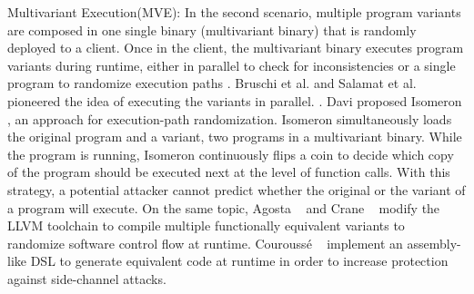 \begin{usage}{Multivariant Execution(MVE):}
    \label{usage:mve}
    \normalfont
    In the second scenario, multiple program variants are composed in one single binary (multivariant binary) that is randomly deployed to a client. Once in the client, the multivariant binary executes program variants during runtime, either in parallel to check for inconsistencies or a single program to randomize execution paths \cite{bhatkar03}. Bruschi et al. \cite{bruschi2007diversified} and Salamat et al. \cite{salamat2007stopping} pioneered the idea of executing the variants in parallel. . Davi \etal proposed Isomeron \cite{davi2015isomeron}, an approach  for execution-path randomization. Isomeron simultaneously loads the original program and a variant, \ie two programs in a multivariant binary. While the program is running, Isomeron continuously flips a coin to decide which copy of the program should be executed next at the level of function calls. With this strategy, a potential attacker cannot predict whether the original or the variant of a program will execute. On the same topic,
    Agosta \etal~\cite{agosta2015meet} and Crane \etal~\cite{crane2015thwarting}
    modify the LLVM toolchain to compile multiple functionally equivalent variants to randomize software control flow at runtime.
    Courouss{\'e} \etal~\cite{courousse2016runtime} implement an assembly-like DSL to generate equivalent code at runtime in order to increase protection against side-channel attacks.  
    

    
\end{usage}


